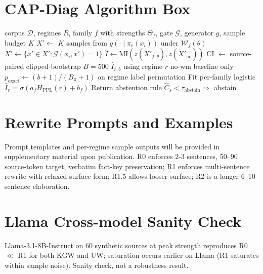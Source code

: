 \documentclass[11pt]{article}
\begin{document}


\appendix

\section{CAP-Diag Algorithm Box}
\label{app:algorithm}

\begin{algorithm}[h]
\caption{CAP-Diag}\label{alg:capdiag}
\begin{algorithmic}[1]
\Require corpus $\mathcal{D}$, regimes $R$, family $f$ with strengths $\Theta_f$, gate $\mathcal{G}$, generator $g$, sample budget $K$
  \State $X' \gets$ $K$ samples from $g(\cdot\mid\pi_r(x_i))$ under $\mathcal{W}_f(\theta)$
  \State $\tilde X' \gets \{x'\in X': \mathcal{G}(x_i,x')=1\}$
\EndFor
{}
  \State $\hat I \gets \mathrm{MI}(z(\tilde X'_{f,\theta}), z(\tilde X'_{\mathrm{no}}))$
  \State CI $\gets$ source-paired clipped-bootstrap $B{=}500$
\EndFor
{}
  \State $\hat I_{r,b}$ using regime-$r$ no-wm baseline only
    \State $p_{\mathrm{exact}}\gets (b+1)/(B_\pi+1)$ on regime label permutation
  \EndFor
\EndFor
\State Fit per-family logistic $\hat I_r=\sigma(a_f H_{\mathrm{PPL}}(r)+b_f)$
\State Return abstention rule $\hat C_s<\tau_{\mathrm{abstain}}\Rightarrow$ abstain
\end{algorithmic}
\end{algorithm}

\section{Rewrite Prompts and Examples}
\label{app:prompts}\label{app:examples}
Prompt templates and per-regime sample outputs will be provided in
supplementary material upon publication. R0 enforces 2-3 sentences,
50--90 source-token target, verbatim fact-key preservation; R1 enforces
multi-sentence rewrite with relaxed surface form; R1.5 allows looser
surface; R2 is a longer 6--10 sentence elaboration.

\section{Llama Cross-model Sanity Check}
\label{app:llama}
Llama-3.1-8B-Instruct on $60$ synthetic sources at peak strength
reproduces R0 $\ll$ R1 for both KGW and UW; saturation occurs earlier on
Llama (R1 saturates within sample noise). Sanity check, not a robustness
result.
\end{document}
